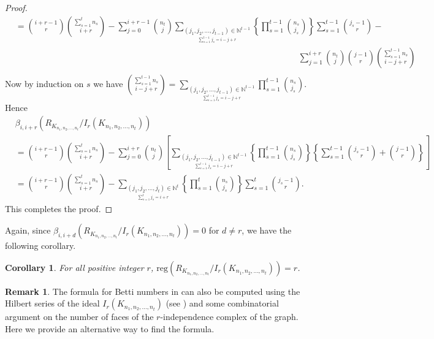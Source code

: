 \documentclass[12pt,reqno]{amsart}
\newtheorem{corollary}[proposition]{Corollary}
\theoremstyle{definition}
\newtheorem{remark}[proposition]{Remark}
\begin{document}
\begin{proof}
{\begin{align*}
&={i+r-1\choose r}{\sum_{s=1}^{t}n_s\choose i+r}-\sum_{j=0}^{i+r-1}{n_t\choose j}\sum_{\underset{\sum_{s=1}^{t-1}j_s=i-j+r}{(j_1,j_2,\ldots,j_{t-1})\in\mathbb N^{t-1}}} \left\{\prod_{s=1}^{t-1}{n_s\choose j_s}\right\}\sum_{s=1}^{t-1}{j_s-1\choose r}-\\
&\hspace{33em} \sum_{j=1}^{i+r}{n_t\choose j}{j-1\choose r}{\sum_{s=1}^{t-1}n_s\choose i-j+r}\\
\end{align*}
}
Now by induction on $s$ we have ${\sum_{s=1}^{t-1}n_s\choose i-j+r}=\sum_{\underset{\sum_{s=1}^{t-1}j_s=i-j+r}{(j_1,j_2,\ldots,j_{t-1})\in\mathbb N^{t-1}}}\prod_{s=1}^{t-1}{n_s\choose j_s}$. Hence
{\footnotesize
\begin{align*}
&\beta_{i,i+r}(R_{K_{n_1,n_2,\ldots,n_t}}/I_r(K_{n_1,n_2,\ldots,n_t}))\\
&={i+r-1\choose r}{\sum_{s=1}^{t}n_s\choose i+r}- \sum_{j=0}^{i+r}{n_t\choose j}\left[\sum_{\underset{\sum_{s=1}^{t-1}j_s=i-j+r}{(j_1,j_2,\ldots,j_{t-1})\in\mathbb N^{t-1}}} \left\{\prod_{s=1}^{t-1}{n_s\choose j_s}\right\}\left\{\sum_{s=1}^{t-1}{j_s-1\choose r}+{j-1\choose r}\right\}\right]\\
&={i+r-1\choose r}{\sum_{s=1}^{t}n_s\choose i+r}-\sum_{\underset{\sum_{s=1}^{t}j_s=i+r}{(j_1,j_2,\ldots,j_{t})\in\mathbb N^{t}}} \left\{\prod_{s=1}^{t}{n_s\choose j_s}\right\}\sum_{s=1}^{t}{j_s-1\choose r}.
\end{align*}
}
This completes the proof.
\end{proof}

Again, since $\beta_{i,i+d}(R_{K_{n_1,n_2,\ldots,n_t}}/I_r(K_{n_1,n_2,\ldots,n_t}))= 0$ for $d\neq r$, we have the following corollary.
\begin{corollary}\label{corollary 2}
    For all positive integer $r$, $\mathrm{reg}(R_{K_{n_1,n_2,\ldots,n_t}}/I_r(K_{n_1,n_2,\ldots,n_t}))=r$.
\end{corollary}

\begin{remark}
    The formula for Betti numbers in  can also be computed using the Hilbert series of the ideal $I_r(K_{n_1,n_2,\ldots,n_t})$ (see \cite[Theorem 4.9]{DRST}) and some combinatorial argument on the number of faces of the $r$-independence complex of the graph. Here we provide an alternative way to find the formula.
\end{remark}
\end{document}
